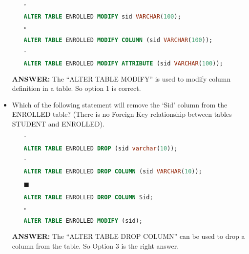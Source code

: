 \documentclass[10pt]{article}
\begin{document}
\begin{itemize}
\begin{enumerate}
				\item[$\square$] 
					\begin{lstlisting}[language=SQL,firstline=1, lastline=1, numbers = right] 
						ALTER TABLE ENROLLED MODIFY sid VARCHAR(100);
					\end{lstlisting}
				
				\item[$\square$] 
					\begin{lstlisting}[language=SQL,firstline=1, lastline=1, numbers = right] 
						ALTER TABLE ENROLLED MODIFY COLUMN (sid VARCHAR(100));
					\end{lstlisting}
			
				\item[$\square$] 
					\begin{lstlisting}[language=SQL,firstline=1, lastline=1, numbers = right] 
						ALTER TABLE ENROLLED MODIFY ATTRIBUTE (sid VARCHAR(100));
					\end{lstlisting}
			\end{enumerate}
			\color{red} \textbf{ANSWER:} \color{black} The “ALTER TABLE MODIFY” is used to modify column definition in a table. So option 1 is correct.
		
		\item Which of the following statement will remove the ‘Sid’ column from the ENROLLED table? (There is no Foreign Key relationship between tables STUDENT and ENROLLED).
			\begin{enumerate}
				\item[$\square$] 
					\begin{lstlisting}[language=SQL,firstline=1, lastline=1, numbers = right] 
						ALTER TABLE ENROLLED DROP (sid varchar(10));
					\end{lstlisting}
				
				\item[$\square$] 
					\begin{lstlisting}[language=SQL,firstline=1, lastline=1, numbers = right] 
						ALTER TABLE ENROLLED DROP COLUMN (sid VARCHAR(10));
					\end{lstlisting}
				
				\item[$\blacksquare$]
					\begin{lstlisting}[language=SQL,firstline=1, lastline=1, numbers = right] 
						ALTER TABLE ENROLLED DROP COLUMN Sid;
					\end{lstlisting}
				
				\item[$\square$]
					\begin{lstlisting}[language=SQL,firstline=1, lastline=1, numbers = right] 
						ALTER TABLE ENROLLED MODIFY (sid);
					\end{lstlisting}
			\end{enumerate}
			\color{red} \textbf{ANSWER:} \color{black} The “ALTER TABLE DROP COLUMN” can be used to drop a column from the table. So Option 3 is the right answer.


\end{itemize}
\end{document}
